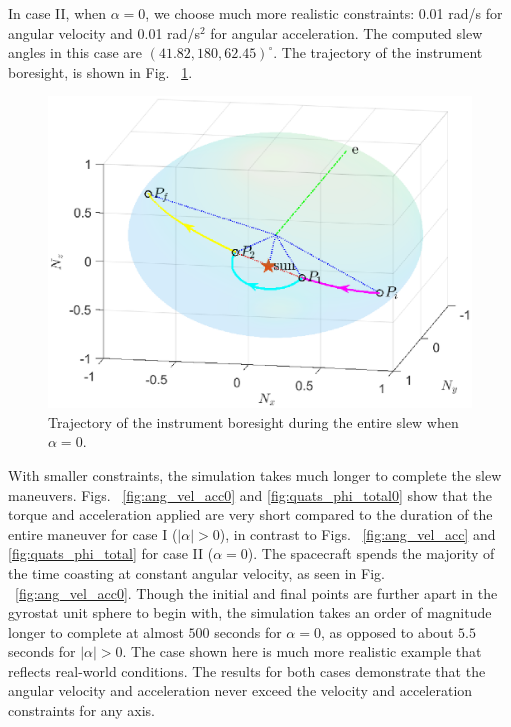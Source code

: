 \documentclass[letterpaper, paper,12pt]{AAS}		%
\begin{document}
In case II,  when $\alpha=0$, we choose much more realistic constraints: 0.01 rad/s for angular velocity and 0.01 rad/s$^2$ for angular acceleration. The computed slew angles in this case are $(41.82, 180, 62.45)^\circ$. The trajectory of the instrument boresight, is shown in Fig. ~\ref{fig:phi1_phi2_phi3_alpha0}.
\begin{figure}[!h]
	\begin{center}
		\includegraphics[width=4.75in]{figures/alpha0/alpha0_phi1_phi2_phi3.eps}		
	\end{center}
\caption{Trajectory of the instrument boresight during the entire slew when $\alpha=0$.}
\label{fig:phi1_phi2_phi3_alpha0}
\end{figure}	
With smaller constraints, the simulation takes much longer to complete the slew maneuvers. Figs. ~\ref{fig:ang_vel_acc0} and \ref{fig:quats_phi_total0} show that the torque and acceleration applied are very short compared to the duration of the entire maneuver for case I ($|\alpha| > 0$), in contrast to Figs. ~\ref{fig:ang_vel_acc} and \ref{fig:quats_phi_total} for case II ($\alpha = 0$). The spacecraft spends the majority of the time coasting at constant angular velocity, as seen in Fig. ~\ref{fig:ang_vel_acc0}. Though the initial and final points are further apart in the gyrostat unit sphere to begin with, the simulation takes an order of magnitude longer to complete at almost $500$ seconds for $\alpha = 0$, as opposed to about $5.5$ seconds for $|\alpha| > 0$. The case shown here is much more realistic example that reflects real-world conditions. The results for both cases demonstrate that the angular velocity and acceleration never exceed the velocity and acceleration constraints for any axis.
\end{document}
